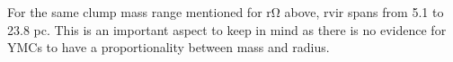 For the same clump mass range mentioned for rΩ above, rvir spans from 5.1 to 23.8 pc. This is an important aspect to keep in mind as there is no evidence for YMCs to have a proportionality between mass and radius.